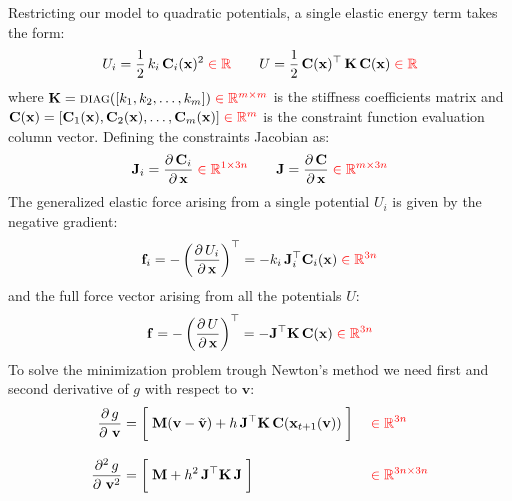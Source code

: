 \documentclass{article}
\newcommand{\pd}[2]{\dfrac{\partial\, #1}{\partial\, #2}}
\newcommand{\pdv}[2]{\dfrac{\partial^2\, #1}{\partial\, #2^2}}
\newcommand{\red}[1]{\textcolor{red}{#1}}
\begin{document}
Restricting our model to quadratic potentials, a single elastic energy term takes the form:
\begin{equation}
    U_i = \frac{1}{2}\, k_i\, \mathbf{C}_i(\mathbf{x})^2
    \; \red{\in \mathbb{R}}
    \qquad
    U = \frac{1}{2}\, \mathbf{C}(\mathbf{x})^\top\, \mathbf{K}\, \mathbf{C}(\mathbf{x})
    \; \red{\in \mathbb{R}}
\end{equation}
where $\mathbf{K} = \textsc{diag}([k_1, k_2, \dots, k_m])\; \red{\in \mathbb{R}^{m\times m}}$ is the stiffness coefficients matrix and $\mathbf{C}(\mathbf{x}) = [\mathbf{C}_1(\mathbf{x}), \mathbf{C}_2(\mathbf{x}), \dots, \mathbf{C}_m(\mathbf{x})]\; \red{\in \mathbb{R}^m}$ is the constraint function evaluation column vector. Defining the constraints Jacobian as:
\begin{equation}
    \mathbf{J}_i = \pd{\mathbf{C}_i}{\mathbf{x}}
     \; \red{\in \mathbb{R}^{1 \times 3n}}
     \qquad
     \mathbf{J} = \pd{\mathbf{C}}{\mathbf{x}}
     \; \red{\in \mathbb{R}^{m \times 3n}}
\end{equation}
The generalized elastic force arising from a single potential $U_i$ is given by the negative gradient:
\begin{equation}
    \mathbf{f}_i = -\left(\pd{U_i}{\mathbf{x}}\right)^\top = -k_i\, \mathbf{J}_i^\top \mathbf{C}_i(\mathbf{x})
    \; \red{\in \mathbb{R}^{3n}}
\end{equation}
and the full force vector arising from all the potentials $U$:
\begin{equation}
    \mathbf{f} = -\left(\pd{U}{\mathbf{x}}\right)^\top =
    - \mathbf{J}^\top \mathbf{K}\, \mathbf{C}(\mathbf{x})
    \; \red{\in \mathbb{R}^{3n}}
\end{equation}
%
To solve the minimization problem trough Newton's method we need first and second derivative of $g$ with respect to $\mathbf{v}$:
%
\begin{equation}
\begin{aligned}
    \pd{g}{\,\mathbf{v}} &=  \bigg[\; \mathbf{M} (\mathbf{v} - \tilde{\mathbf{v}}) + h\,\mathbf{J}^\top \mathbf{K}\, \mathbf{C}(\mathbf{x}_{t+1}(\mathbf{v}))\; \bigg]
    \;&&\red{\in \mathbb{R}^{3n}} \\[2ex]
    \pdv{g}{\,\mathbf{v}} &= \bigg[\; \mathbf{M} + h^2\, \mathbf{J}^\top \mathbf{K}\, \mathbf{J} \; \bigg]
    \;&&\red{\in \mathbb{R}^{3n \times 3n}}
\end{aligned}
\end{equation}
\end{document}
